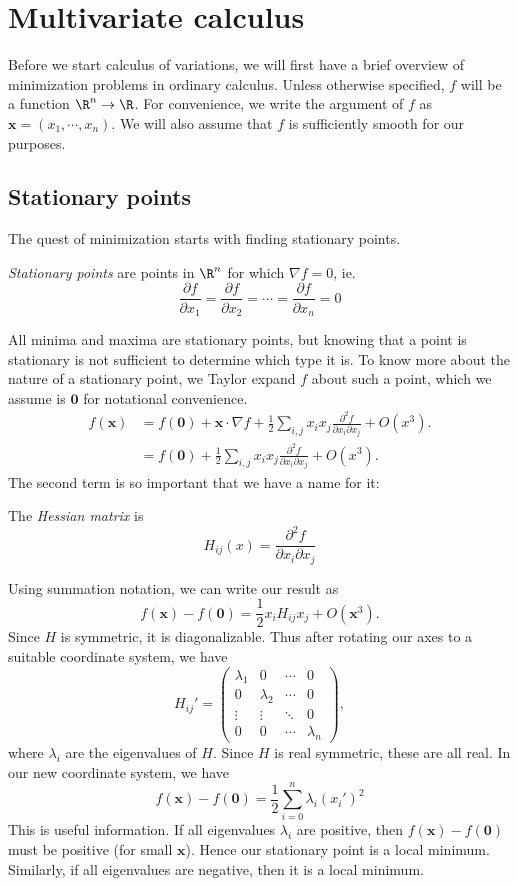 \documentclass[a4paper]{article}
\begin{document}
\section{Multivariate calculus}
Before we start calculus of variations, we will first have a brief overview of minimization problems in ordinary calculus. Unless otherwise specified, $f$ will be a function $\R^n \to \R$. For convenience, we write the argument of $f$ as $\mathbf{x} = (x_1, \cdots, x_n)$. We will also assume that $f$ is sufficiently smooth for our purposes.

\subsection{Stationary points}
The quest of minimization starts with finding stationary points.
\begin{defi}
  \emph{Stationary points} are points in $\R^n$ for which $\nabla f = 0$, ie.
  \[
    \frac{\partial f}{\partial x_1} = \frac{\partial f}{\partial x_2} = \cdots = \frac{\partial f}{\partial x_n} = 0
  \]
\end{defi}
All minima and maxima are stationary points, but knowing that a point is stationary is not sufficient to determine which type it is. To know more about the nature of a stationary point, we Taylor expand $f$ about such a point, which we assume is $\mathbf{0}$ for notational convenience.
\begin{align*}
  f(\mathbf{x}) &= f(\mathbf{0}) + \mathbf{x}\cdot \nabla f + \frac{1}{2}\sum_{i, j}x_ix_j\frac{\partial^2 f}{\partial x_i \partial x_j} + O(x^3).\\
  &= f(\mathbf{0}) + \frac{1}{2}\sum_{i, j}x_ix_j\frac{\partial^2 f}{\partial x_i \partial x_j} + O(x^3).
\end{align*}
The second term is so important that we have a name for it:
\begin{defi}
  The \emph{Hessian matrix} is
  \[
    H_{ij}(x) = \frac{\partial^2 f}{\partial x_i \partial x_j}
  \]
\end{defi}
Using summation notation, we can write our result as
\[
  f(\mathbf{x}) - f(\mathbf{0}) = \frac{1}{2}x_i H_{ij}x_j + O(\mathbf{x}^3).
\]
Since $H$ is symmetric, it is diagonalizable. Thus after rotating our axes to a suitable coordinate system, we have
\[
  H_{ij}' =
  \begin{pmatrix}
    \lambda_1 & 0 & \cdots & 0\\
    0 & \lambda_2 & \cdots & 0\\
    \vdots & \vdots & \ddots & 0\\
    0 & 0 & \cdots & \lambda_n
  \end{pmatrix},
\]
where $\lambda_i$ are the eigenvalues of $H$. Since $H$ is real symmetric, these are all real. In our new coordinate system, we have
\[
  f(\mathbf{x}) - f(\mathbf{0}) = \frac{1}{2}\sum_{i = 0}^n \lambda_i (x_i')^2
\]
This is useful information. If all eigenvalues $\lambda_i$ are positive, then $f(\mathbf{x}) - f(\mathbf{0})$ must be positive (for small $\mathbf{x}$). Hence our stationary point is a local minimum. Similarly, if all eigenvalues are negative, then it is a local minimum.
\end{document}
